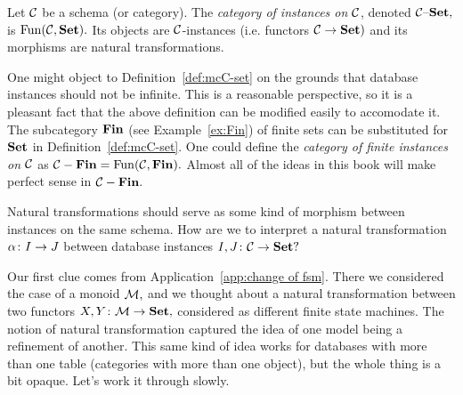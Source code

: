 \documentclass[../main/CT4S-EN-RU]{subfiles}
\begin{document}
\begin{blockRUS}
\end{blockRUS}

\begin{definitionENG}\label{def:mcC-set}
Let $\mathcal{C}$ be a schema (or category). The {\em category of instances on $\mathcal{C}$}, denoted $\mathcal{C}{\text \textendash}{\mathbf{Set}},$ is $\operatorname{Fun}(\mathcal{C},{\mathbf{Set}}).$ Its objects are $\mathcal{C}$-instances (i.e. functors $\mathcal{C}\rightarrow{\mathbf{Set}})$ and its morphisms are natural transformations.
\end{definitionENG}

\begin{definitionRUS}\label{def:mcC-set}
\end{definitionRUS}

\begin{remarkENG}
One might object to Definition~\ref{def:mcC-set} on the grounds that database instances should not be infinite. This is a reasonable perspective, so it is a pleasant fact that the above definition can be modified easily to accomodate it. The subcategory ${\mathbf{Fin}}$ (see Example~\ref{ex:Fin}) of finite sets can be substituted for ${\mathbf{Set}}$ in Definition~\ref{def:mcC-set}. One could define the {\em category of finite instances on $\mathcal{C}$} as $\mathcal{C}-{\mathbf{Fin}}=\operatorname{Fun}(\mathcal{C},{\mathbf{Fin}}).$ Almost all of the ideas in this book will make perfect sense in $\mathcal{C}-{\mathbf{Fin}}.$
\end{remarkENG}

\begin{remarkRUS}
\end{remarkRUS}

\begin{blockENG}
Natural transformations should serve as some kind of morphism between instances on the same schema. How are we to interpret a natural transformation $\alpha\colon I\rightarrow J$ between database instances $I,J\colon\mathcal{C}\rightarrow{\mathbf{Set}}?$ 
\end{blockENG}

\begin{blockRUS}
\end{blockRUS}

\begin{blockENG}
Our first clue comes from Application~\ref{app:change of fsm}. There we considered the case of a monoid $\mathcal{M},$ and we thought about a natural transformation between two functors $X,Y\colon\mathcal{M}\rightarrow{\mathbf{Set}},$ considered as different finite state machines. The notion of natural transformation captured the idea of one model being a refinement of another. This same kind of idea works for databases with more than one table (categories with more than one object), but the whole thing is a bit opaque. Let's work it through slowly.
\end{blockENG}
\end{document}
